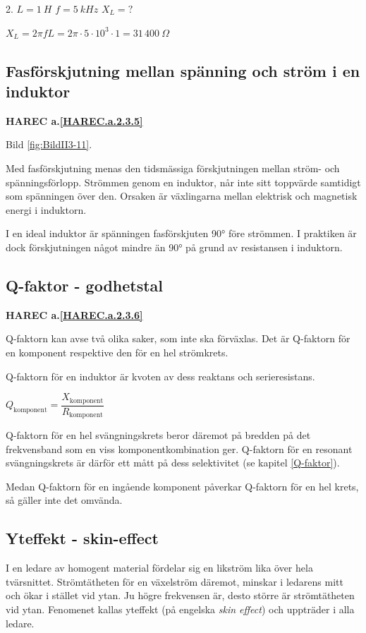 2. \(L = 1\ H\) \(f = 5\ kHz\) \(X_L = ?\)

\(X_L = 2πfL = 2π \cdot 5 \cdot 10^3 \cdot 1 = 31\, 400\ Ω\)

\subsection{Fasförskjutning mellan spänning och ström i en induktor}
\textbf{HAREC a.\ref{HAREC.a.2.3.5}\label{myHAREC.a.2.3.5}}

Bild \ref{fig:BildII3-11}.

Med fasförskjutning menas den tidsmässiga förskjutningen mellan ström- och
spänningsförlopp. Strömmen genom en induktor, når inte sitt toppvärde samtidigt
som spänningen över den. Orsaken är växlingarna mellan elektrisk och magnetisk
energi i induktorn.

I en ideal induktor är spänningen fasförskjuten 90° före strömmen. I praktiken
är dock förskjutningen något mindre än 90° på grund av resistansen i induktorn.

\subsection{Q-faktor - godhetstal}
\textbf{HAREC a.\ref{HAREC.a.2.3.6}\label{myHAREC.a.2.3.6}}

Q-faktorn kan avse två olika saker, som inte ska förväxlas. Det är Q-faktorn
för en komponent respektive den för en hel strömkrets.

Q-faktorn för en induktor är kvoten av dess reaktans och serieresistans.

\(Q_\text{komponent} = \dfrac{X_\text{komponent}}{R_\text{komponent}}\)

Q-faktorn för en hel svängningskrets beror däremot på bredden på det
frekvensband som en viss komponentkombination ger. Q-faktorn för en resonant
svängningskrets är därför ett mått på dess selektivitet (se kapitel \ref{Q-faktor}).

Medan Q-faktorn för en ingående komponent påverkar Q-faktorn för en hel krets,
så gäller inte det omvända.

\subsection{Yteffekt - skin-effect}

I en ledare av homogent material fördelar sig en likström lika över hela
tvärsnittet. Strömtätheten för en växelström däremot, minskar i ledarens mitt
och ökar i stället vid ytan. Ju högre frekvensen är, desto större är
strömtätheten vid ytan. Fenomenet kallas yteffekt (på engelska
\emph{skin effect}) och uppträder i alla ledare.

